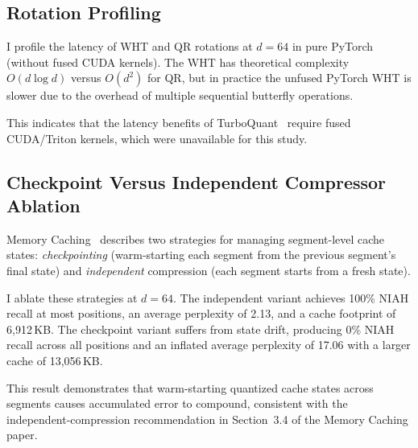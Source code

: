 \subsection{Rotation Profiling}
\label{sec:method:rotation}

I profile the latency of WHT and QR rotations at $d = 64$ in pure
PyTorch (without fused CUDA kernels).
The WHT has theoretical complexity $O(d \log d)$ versus $O(d^2)$ for
QR, but in practice the unfused PyTorch WHT is slower due to the
overhead of multiple sequential butterfly operations.

This indicates that the latency benefits of TurboQuant~\cite{zandieh2025turboquant} require fused CUDA/Triton kernels, which were unavailable for this study.

\subsection{Checkpoint Versus Independent Compressor Ablation}
\label{sec:method:ablation}

Memory Caching~\cite{behrouz2026mc} describes two strategies for
managing segment-level cache states: \emph{checkpointing} (warm-starting
each segment from the previous segment's final state) and
\emph{independent} compression (each segment starts from a fresh state).

I ablate these strategies at $d = 64$.
The independent variant achieves 100\% NIAH recall at most positions,
an average perplexity of 2.13, and a cache footprint of 6{,}912\,KB.
The checkpoint variant suffers from state drift, producing 0\% NIAH
recall across all positions and an inflated average perplexity of 17.06
with a larger cache of 13{,}056\,KB.

This result demonstrates that warm-starting quantized cache states
across segments causes accumulated error to compound, consistent with
the independent-compression recommendation in Section~3.4 of the
Memory Caching paper.
